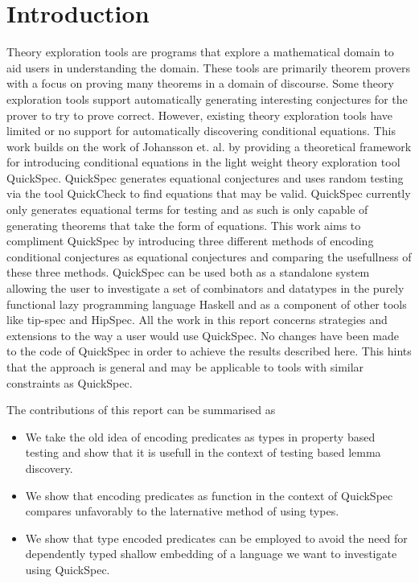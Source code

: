 \section{Introduction}
Theory exploration tools are programs that
explore a mathematical domain to aid users in
understanding the domain. %
These tools are primarily theorem provers with a focus
on proving many theorems in a domain of discourse.
Some theory exploration tools support automatically generating
interesting conjectures for the prover to try to prove correct.
However, existing theory exploration tools have limited or no
support for automatically discovering conditional equations. %
This work builds on the work of Johansson et. al. %
by providing a theoretical framework for introducing conditional
equations in the light weight theory exploration tool QuickSpec. %
QuickSpec generates equational conjectures and uses random testing via the tool QuickCheck %
to find equations that may be valid. QuickSpec currently only generates
equational terms for testing and as such is only capable of generating
theorems that take the form of equations. 
This work aims to compliment QuickSpec by introducing three different methods
of encoding conditional conjectures as equational conjectures and comparing
the usefullness of these three methods. QuickSpec can be used both as a standalone
system allowing the user to investigate a set of combinators and datatypes in the
purely functional lazy programming language Haskell and as a component of other tools %
like tip-spec and HipSpec. %
All the work in this report concerns strategies and extensions to the way a user would
use QuickSpec. No changes have been made to the code of QuickSpec in order to
achieve the results described here. This hints that the approach is general
and may be applicable to tools with similar constraints as QuickSpec.

The contributions of this report can be summarised as
\begin{itemize}
    \item We take the old idea of encoding predicates as types
        in property based testing and show that it is usefull in
        the context of testing based lemma discovery.

    \item We show that encoding predicates as function in the context
        of QuickSpec compares unfavorably to the laternative method
        of using types.

    \item We show that type encoded predicates can be employed to avoid 
        the need for dependently typed shallow embedding of a language
        we want to investigate using QuickSpec.
\end{itemize}
